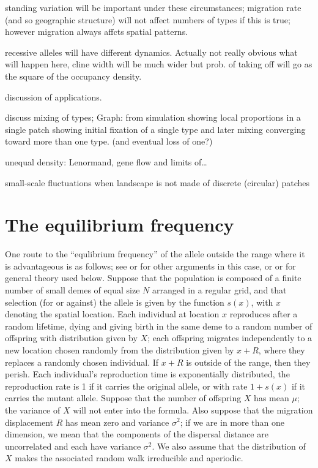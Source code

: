 \documentclass{article}
\begin{document}
standing variation will be important under these circumstances; 
migration rate (and so geographic structure) will not affect numbers of types if this is true; 
however migration always affcts spatial patterns. 

recessive alleles will have different dynamics. Actually not really
obvious what will happen here, cline width will be much wider but
prob. of taking off will go as the square of the occupancy density.



discussion of applications. 

discuss mixing of types; 
Graph: from simulation showing local proportions in a single patch showing initial fixation of a single type and later mixing converging toward more than one type.  (and eventual loss of one?)

unequal density: Lenormand, gene flow and limits of\dots

small-scale fluctuations
when landscape is not made of discrete (circular) patches



\appendix


\section{The equilibrium frequency}
\label{apx:eqfreq}

One route to the ``equlibrium frequency'' of the allele outside the range where it is advantageous is as follows;
see \citet{slatkin1973geneflow} or \citet{barton1987establishment,pollak1966survival} for other arguments in this case, 
or \citet{etheridge2000introduction} or \citet{dawson1993measurevalued} for general theory used below.
Suppose that the population is composed of a finite number of small demes of equal size $N$ arranged in a regular grid,
and that selection (for or against) the allele is given by the function $s(x)$, with $x$ denoting the spatial location.
Each individual at location $x$ reproduces after a random lifetime,
dying and giving birth in the same deme to a random number of offspring with distribution given by $X$;
each offspring migrates independently to a new location chosen randomly from the distribution given by $x+R$,
where they replaces a randomly chosen individual.
If $x+R$ is outside of the range, then they perish.
Each individual's reproduction time is exponentially distributed, 
the reproduction rate is 1 if it carries the original allele, or with rate $1+s(x)$ if it carries the mutant allele.
Suppose that the number of offspring $X$ has mean $\mu$; the variance of $X$ will not enter into the formula.
Also suppose that the migration displacement $R$ has mean zero and variance $\sigma^2$;
if we are in more than one dimension, we mean that the components of the dispersal distance are uncorrelated
and each have variance $\sigma^2$.
We also assume that the distribution of $X$ makes the associated random walk irreducible and aperiodic.
\end{document}
